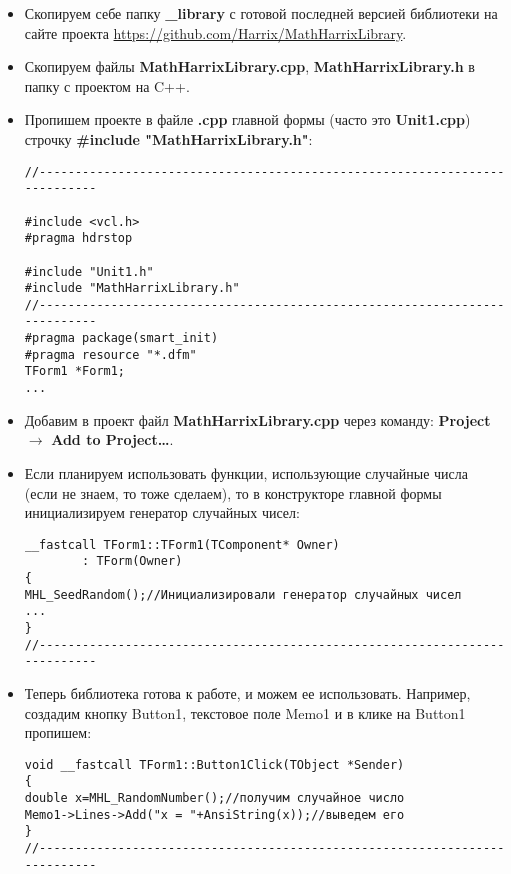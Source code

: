 \documentclass[a4paper,12pt]{article}
\begin{document}
\begin{itemize}
\item Скопируем себе папку \textbf{\_library} с готовой последней версией библиотеки на сайте проекта \href{https://github.com/Harrix/MathHarrixLibrary}{https://github.com/Harrix/MathHarrixLibrary}.

\item Скопируем файлы \textbf{MathHarrixLibrary.cpp}, \textbf{MathHarrixLibrary.h} в папку с проектом на C++.

\item Пропишем проекте в файле \textbf{.cpp} главной формы (часто это \textbf{Unit1.cpp}) строчку \textbf{\#include "MathHarrixLibrary.h"}:
\begin{lstlisting}[label=install_code_01,caption=Подключение библиотеки]
//---------------------------------------------------------------------------

#include <vcl.h>
#pragma hdrstop

#include "Unit1.h"
#include "MathHarrixLibrary.h"
//---------------------------------------------------------------------------
#pragma package(smart_init)
#pragma resource "*.dfm"
TForm1 *Form1;
...
\end{lstlisting}

\item Добавим в проект файл \textbf{MathHarrixLibrary.cpp} через команду: \textbf{Project} $\rightarrow$ \textbf{Add to Project\dots}.

\item Если планируем использовать функции, использующие случайные числа (если не знаем, то тоже сделаем), то в конструкторе главной формы инициализируем генератор случайных чисел:
\begin{lstlisting}[label=install_code_02,caption=Инициализация генератора случайных чисел]
__fastcall TForm1::TForm1(TComponent* Owner)
        : TForm(Owner)
{
MHL_SeedRandom();//Инициализировали генератор случайных чисел
...
}
//---------------------------------------------------------------------------
\end{lstlisting}

\item Теперь библиотека готова к работе, и можем ее использовать. Например, создадим кнопку Button1, текстовое поле Memo1 и в клике на Button1 пропишем:
\begin{lstlisting}[label=install_code_03,caption=Пример использования]
void __fastcall TForm1::Button1Click(TObject *Sender)
{
double x=MHL_RandomNumber();//получим случайное число
Memo1->Lines->Add("x = "+AnsiString(x));//выведем его
}
//---------------------------------------------------------------------------
\end{lstlisting}
\end{itemize}
\end{document}
